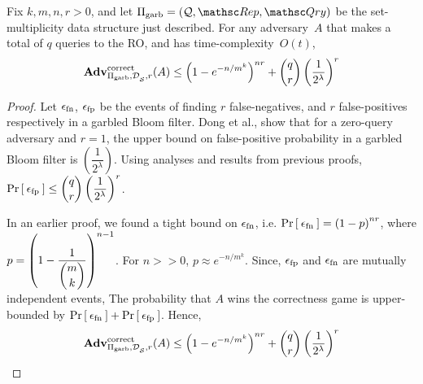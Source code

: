 \begin{theorem}\label{thm:gbf-correctnessUB}
Fix $k,m,n,r>0$, and let $\Pi_{\mathrm{garb}}= (\calQ,\Rep, \Qry)$ be the set-multiplicity data structure just described. For any adversary~$A$ that makes a total of $q$ queries to the RO, and has time-complexity~$O(t)$,
\[
\mathrm{\mathbf{Adv}}^{\mathrm{correct}}_{\Pi_{\mathrm{garb}},\mathcal{D}_{{\cal S}}^{},r}(A)  \leq \left(1 - e^{-n/m^k}\right)^{nr} + \dbinom{q}{r}\left(\dfrac{1}{2^\lambda}\right)^r
\]
\end{theorem}

\begin{proof}
Let $\epsilon_{\mathrm{fn}}$, $\epsilon_{\mathrm{fp}}$ be the events of finding $r$ false-negatives, and $r$ false-positives respectively in a garbled Bloom filter. Dong et al.\cite{dong2013private}, show that for a zero-query adversary and $r=1$, the upper bound on false-positive probability in a garbled Bloom filter is $\left(\dfrac{1}{2^\lambda}\right)$. Using analyses and results from  previous proofs, $\Pr\left[\: \epsilon_{\mathrm{fp}} \:\right] \leq \dbinom{q}{r}\left(\dfrac{1}{2^\lambda}\right)^r$. 

In an earlier proof, we found a tight bound on $\epsilon_{\mathrm{fn}}$, i.e. $\Pr\left[\: \epsilon_{\mathrm{fn}} \:\right] = \left( 1-p \right)^{nr}$, where $p = \left( 1-\dfrac{1}{\dbinom{m}{k}} \right)^{n-1}$. For $n >> 0$, $p \approx  e^{-n/m^k}$. Since, $\epsilon_{\mathrm{fp}}$ and $\epsilon_{\mathrm{fn}}$ are mutually independent events, The probability that $A$ wins the correctness game is upper-bounded by $\Pr\left[\: \epsilon_{\mathrm{fn}} \:\right] + \Pr\left[\: \epsilon_{\mathrm{fp}} \:\right]$. Hence,
\[
\mathrm{\mathbf{Adv}}^{\mathrm{correct}}_{\Pi_{\mathrm{garb}},\mathcal{D}_{{\cal S}}^{},r}(A)  \leq \left(1 - e^{-n/m^k}\right)^{nr} + \dbinom{q}{r}\left(\dfrac{1}{2^\lambda}\right)^r
\]
\end{proof}